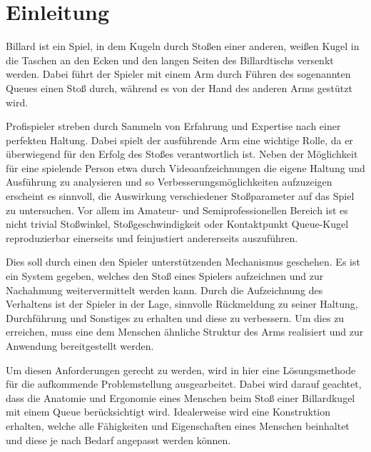 \chapter{Einleitung}
	Billard ist ein Spiel, in dem Kugeln durch Stoßen einer anderen, weißen Kugel in die Taschen an den Ecken und den langen Seiten des Billardtischs versenkt werden.
	Dabei führt der Spieler mit einem Arm durch Führen des sogenannten Queues einen Stoß durch, während es von der Hand des anderen Arms gestützt wird.\par\medskip
	Profispieler streben durch Sammeln von Erfahrung und Expertise nach einer perfekten Haltung.
	Dabei spielt der ausführende Arm eine wichtige Rolle, da er überwiegend für den Erfolg des Stoßes verantwortlich ist.
	Neben der Möglichkeit für eine spielende Person etwa durch Videoaufzeichnungen die eigene Haltung und Ausführung zu analysieren und so Verbesserungsmöglichkeiten aufzuzeigen erscheint es sinnvoll, die Auswirkung verschiedener Stoßparameter auf das Spiel zu untersuchen.
	Vor allem im Amateur- und Semiprofessionellen Bereich ist es nicht trivial Stoßwinkel, Stoßgeschwindigkeit oder Kontaktpunkt Queue-Kugel reproduzierbar einerseits und feinjustiert andererseits auszuführen.\par\medskip
	Dies soll durch einen den Spieler unterstützenden Mechanismus geschehen.
	Es ist ein System gegeben, welches den Stoß eines Spielers aufzeichnen und zur Nachahmung weitervermittelt werden kann.
	Durch die Aufzeichnung des Verhaltens ist der Spieler in der Lage, sinnvolle Rückmeldung zu seiner Haltung, Durchführung und Sonstiges zu erhalten und diese zu verbessern.
	Um dies zu erreichen, muss eine dem Menschen ähnliche Struktur des Arms realisiert und zur Anwendung bereitgestellt werden.\par
	Um diesen Anforderungen gerecht zu werden, wird in hier eine Lösungsmethode für die aufkommende Problemstellung ausgearbeitet.
	Dabei wird darauf geachtet, dass die Anatomie und Ergonomie eines Menschen beim Stoß einer Billardkugel mit einem Queue berücksichtigt wird.
	Idealerweise wird eine Konstruktion erhalten, welche alle Fähigkeiten und Eigenschaften eines Menschen beinhaltet und diese je nach Bedarf angepasst werden können.